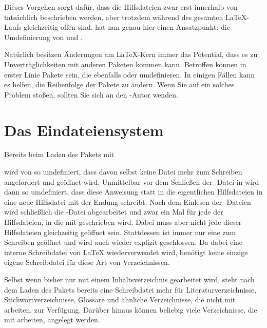 Dieses Vorgehen sorgt dafür, dass die Hilfsdateien zwar erst innerhalb von
 tatsächlich beschrieben werden, aber trotzdem
während des gesamten \LaTeX-Laufs gleichzeitig offen sind. 
hat nun genau hier einen Ansatzpunkt: die Umdefinierung von 
und .

Natürlich besitzen Änderungen am \LaTeX-Kern immer das
Potential, dass es zu Unverträglichkeiten mit anderen Paketen kommen
kann. Betroffen können in erster Linie Pakete sein, die ebenfalls
 oder  umdefinieren. In einigen Fällen kann
es helfen, die Reihenfolge der Pakete zu ändern. Wenn Sie auf
ein solches Problem stoßen, sollten Sie sich an den \KOMAScript-Autor wenden.


\section{Das Eindateiensystem}

Bereits beim Laden des Pakets mit
\begin{lstcode}
  \usepackage{scrwfile}
\end{lstcode}
wird  von  so
umdefiniert, dass davon selbst keine Datei mehr zum Schreiben angefordert und
geöffnet wird. Unmittelbar vor dem Schließen der -Datei in
 wird dann  so umdefiniert,
dass diese Anweisung statt in die eigentlichen Hilfsdateien in eine neue
Hilfsdatei mit der Endung  schreibt. Nach dem Einlesen der
-Dateien wird schließlich die -Datei abgearbeitet und zwar
ein Mal für jede der Hilfsdateien, in die mit  geschrieben
wird. Dabei muss aber nicht jede dieser Hilfsdateien gleichzeitig
geöffnet sein. Stattdessen ist immer nur eine zum Schreiben geöffnet und wird
auch wieder explizit geschlossen. Da dabei eine interne Schreibdatei von
\LaTeX{} wiederverwendet wird, benötigt  keine einzige
eigene Schreibdatei für diese Art von Verzeichnissen.

Selbst wenn bisher nur mit einem Inhaltsverzeichnis gearbeitet wird, steht
nach dem Laden des Pakets bereits eine Schreibdatei mehr für
Literaturverzeichnisse, Stichwortverzeichnisse, Glossare und ähnliche
Verzeichnisse, die nicht mit  arbeiten, zur
Verfügung. Darüber hinaus können beliebig viele Verzeichnisse, die mit
 arbeiten, angelegt werden.%
%

